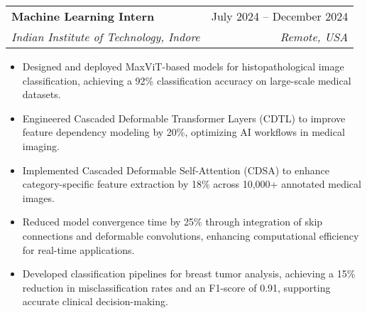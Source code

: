 \documentclass[letterpaper,11pt]{article}
\makeatletter
\newcommand{\resumeItem}[1]{
  \item\small{
    {#1 \vspace{-2pt}}
  }
}
\newcommand{\resumeSubheading}[4]{
  \vspace{-2pt}\item
    \begin{tabular*}{0.97\textwidth}[t]{l@{\extracolsep{\fill}}r}
      \textbf{#1} & #2 \\
      \textit{\small#3} & \textit{\small #4} \\
    \end{tabular*}\vspace{-7pt}
}
\newcommand{\resumeItemListStart}{\begin{itemize}}
\newcommand{\resumeItemListEnd}{\end{itemize}\vspace{-5pt}}
\makeatother
\begin{document}
\resumeSubheading
  {Machine Learning Intern \href{https://github.com/Akash-Kadali/A-Graph-Based-Framework-for-User-Level-Feature-Modeling-with-Contextual-Embeddings}{\faGithub}}{July 2024 -- December 2024}
  {Indian Institute of Technology, Indore}{Remote, USA}


      \resumeItemListStart
        \resumeItem{Designed and deployed MaxViT-based models for histopathological image classification, achieving a 92\% classification accuracy on large-scale medical datasets.}
        \resumeItem{Engineered Cascaded Deformable Transformer Layers (CDTL) to improve feature dependency modeling by 20\%, optimizing AI workflows in medical imaging.}
        \resumeItem{Implemented Cascaded Deformable Self-Attention (CDSA) to enhance category-specific feature extraction by 18\% across 10,000+ annotated medical images.}
        \resumeItem{Reduced model convergence time by 25\% through integration of skip connections and deformable convolutions, enhancing computational efficiency for real-time applications.}
        \resumeItem{Developed classification pipelines for breast tumor analysis, achieving a 15\% reduction in misclassification rates and an F1-score of 0.91, supporting accurate clinical decision-making.}
    \resumeItemListEnd
\end{document}
